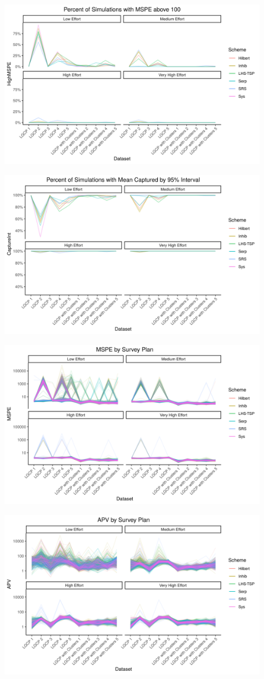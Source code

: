 \documentclass[review]{elsarticle}
\begin{document}
\includegraphics[width=4.5in]{../graphics/HighMSPE-profile.png}

\includegraphics[width=4.5in]{../graphics/IntCapture-profile.png}

\includegraphics[width=4.5in]{../graphics/MSPE-profile.png}

\includegraphics[width=4.5in]{../graphics/APV-profile.png}
\end{document}
